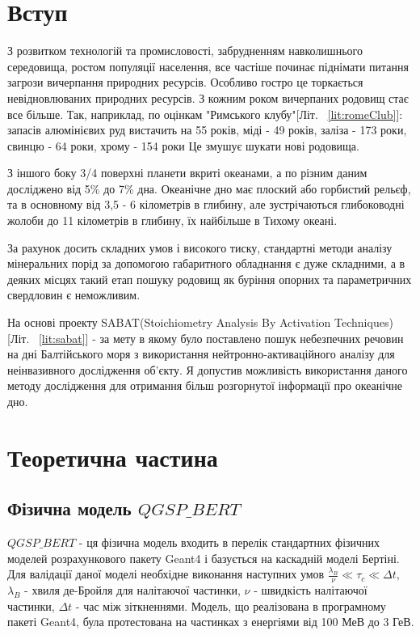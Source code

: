 \documentclass[a4paper, 14pt]{article}
\numberwithin{equation}{section}
\numberwithin{table}{section}
\begin{document}
\section{Вступ}

З розвитком технологій та промисловості, забрудненням навколишнього середовища, ростом популяції населення, все частіше починає піднімати питання загрози вичерпання природних ресурсів. Особливо гостро це торкається невідновлюваних природних ресурсів. З кожним роком вичерпаних родовищ стає все більше. Так, наприклад, по оцінкам "Римського клубу"[Літ. ~\ref{lit:romeClub}]: запасів алюмінієвих руд вистачить на 55 років, міді - 49 років, заліза - 173 роки, свинцю - 64 роки, хрому - 154 роки Це змушує шукати нові родовища.

З іншого боку 3/4 поверхні планети вкриті океанами, а по різним даним досліджено від 5\% до 7\% дна.
Океанічне дно має плоский або горбистий рельєф, та в основному від 3,5 - 6 кілометрів в глибину, але зустрічаються глибоководні жолоби до 11 кілометрів в глибину, їх найбільше в Тихому океані. 

За рахунок досить складних умов і високого тиску, стандартні методи аналізу мінеральних порід за допомогою габаритного обладнання є дуже складними, а в деяких місцях такий етап пошуку родовищ як буріння опорних та параметричних свердловин є неможливим.

На основі проекту SABAT(Stoichiometry Analysis By Activation Techniques)[Літ. ~\ref{lit:sabat}] - за мету в якому було поставлено пошук небезпечних речовин на дні Балтійського моря з використання нейтронно-активаційного аналізу для неінвазивного дослідження об'єкту. Я допустив можливість використання даного методу дослідження для отримання більш розгорнутої інформації про океанічне дно.		

\newpage
\section{Теоретична частина}
\setcounter{figure}{0} 
\subsection{Фізична модель $QGSP\_BERT$}
$QGSP\_BERT$ - ця фізична модель входить в перелік стандартних фізичних моделей розрахункового пакету Geant4 і базується на каскадній моделі Бертіні. Для валідації даної моделі необхідне виконання наступних умов $\frac{\lambda_B}{\nu} \ll \tau_c \ll \Delta{t}$, $\lambda_B$ - хвиля де-Бройля для налітаючої частинки, $\nu$ - швидкість налітаючої частинки, $\Delta{t}$ - час між зіткненнями. 
Модель, що реалізована в програмному пакеті Geant4, була протестована на частинках з енергіями від 100 МеВ до 3 ГеВ.
\end{document}
